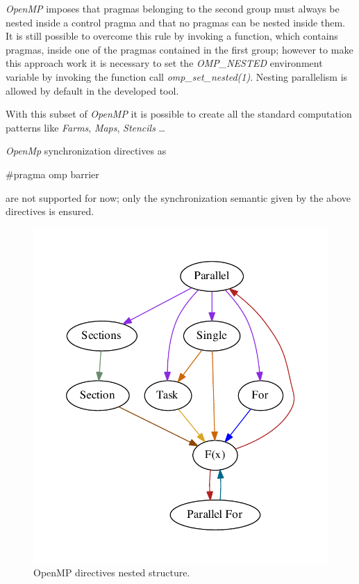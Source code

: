 \documentclass[a4paper,11pt,oneside]{book}
\begin{document}
\emph{OpenMP} imposes that pragmas belonging to the second group must always be nested inside a control pragma and that no pragmas can be nested inside them. It is still possible to overcome this rule by invoking a function, which contains pragmas, inside one of the pragmas contained in the first group; however to make this approach work it is necessary to set the \emph{OMP\_NESTED} environment variable by invoking the function call \emph{omp\_set\_nested(1)}. Nesting parallelism is allowed by default in the developed tool. 

With this subset of \emph{OpenMP} it is possible to create all the standard computation patterns like \emph{Farms}, \emph{Maps}, \emph{Stencils} \dots 

\emph{OpenMp} synchronization directives as \begin{bf}$\#$pragma omp barrier\end{bf} are not supported for now; only the synchronization semantic given by the above directives is ensured. 

\begin{figure}[H]
\centering
\includegraphics[scale=0.8]{omp.pdf}
\caption{OpenMP directives nested structure.}
\end{figure}
\end{document}
